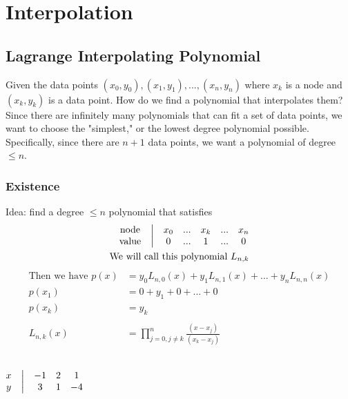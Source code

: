 \documentclass[12pt, letterpaper]{article}
\begin{document}
\section{Interpolation}
\subsection{Lagrange Interpolating Polynomial}

Given the data points $(x_0,y_0), (x_1,y_1), ..., (x_n,y_n)$ where $x_k$ is a node and $(x_k,y_k)$ is a data point. 
How do we find a polynomial that interpolates them? \\

\noindent Since there are infinitely many polynomials that can fit a set of data points, we want to choose the "simplest," 
or the lowest degree polynomial possible. Specifically, since there are $n+1$ data points, we want a polynomial of degree $\le n$.

\subsubsection{Existence}

Idea: find a degree $\le n$ polynomial that satisfies
\begin{align*}
    \begin{matrix}
        \text{node}  & \bigl{|} & x_0  & ... &   x_k & ... &  x_n \\
        \text{value} & \bigl{|} & 0    & ... &   1   & ... & 0     
    \end{matrix} \\
    \text{We will call this polynomial } L_{n,k}
\end{align*}
\begin{align*}
    \text{Then we have } p(x) &= y_0 L_{n,0}(x) + y_1 L_{n,1}(x) + ... + y_n L_{n,n}(x) \\
    p(x_1) &= 0 + y_1 + 0 + ... + 0 \\ 
    p(x_k) &= y_k \\ \\ 
    L_{n,k}(x) &= \displaystyle\prod_{j=0,j\ne k}^{n}\frac{(x-x_j)}{(x_k-x_j)}
\end{align*}

\noindent {} \\

    $\begin{matrix}
        x & \bigl{|} & -1 & 2 & 1 \\
        y & \bigl{|} & 3  & 1 & -4    
    \end{matrix}$\\
\end{document}
